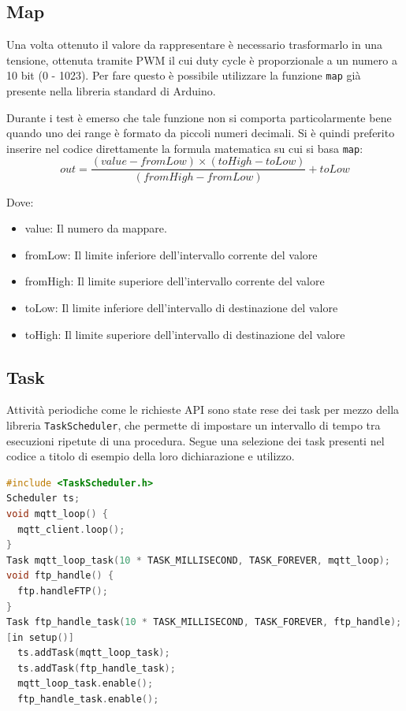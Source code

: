 \documentclass[12pt,a4paper]{report}
\begin{document}
\subsection{Map}
Una volta ottenuto il valore da rappresentare è necessario trasformarlo in una tensione, ottenuta tramite PWM il cui duty cycle è
proporzionale a un numero a 10 bit (0 - 1023). Per fare questo è possibile utilizzare la funzione \texttt{map} già presente nella
libreria standard di Arduino.


Durante i test è emerso che tale funzione non si comporta particolarmente bene quando uno dei range è formato da piccoli numeri
decimali. Si è quindi preferito inserire nel codice direttamente la formula matematica su cui si basa \texttt{map}:
\[out = \frac{(value - fromLow) \times (toHigh - toLow)}{(fromHigh - fromLow)} + toLow \]

\noindent Dove:\cite{arduinomap}
\begin{itemize}
  \item value: Il numero da mappare.
  \item fromLow: Il limite inferiore dell'intervallo corrente del valore
  \item fromHigh: Il limite superiore dell'intervallo corrente del valore
  \item toLow: Il limite inferiore dell'intervallo di destinazione del valore
  \item toHigh: Il limite superiore dell'intervallo di destinazione del valore
\end{itemize}

\subsection{Task}
Attività periodiche come le richieste API sono state rese dei task per mezzo della libreria \texttt{TaskScheduler}, che permette di
impostare un intervallo di tempo tra esecuzioni ripetute di una procedura.
Segue una selezione dei task presenti nel codice a titolo di esempio della loro dichiarazione e utilizzo.
\begin{lstlisting}[language=cpp]
#include <TaskScheduler.h>
Scheduler ts;
void mqtt_loop() {
  mqtt_client.loop();
}
Task mqtt_loop_task(10 * TASK_MILLISECOND, TASK_FOREVER, mqtt_loop);
void ftp_handle() {
  ftp.handleFTP();
}
Task ftp_handle_task(10 * TASK_MILLISECOND, TASK_FOREVER, ftp_handle);
[in setup()]
  ts.addTask(mqtt_loop_task);
  ts.addTask(ftp_handle_task);
  mqtt_loop_task.enable();
  ftp_handle_task.enable();

\end{lstlisting}
\end{document}
